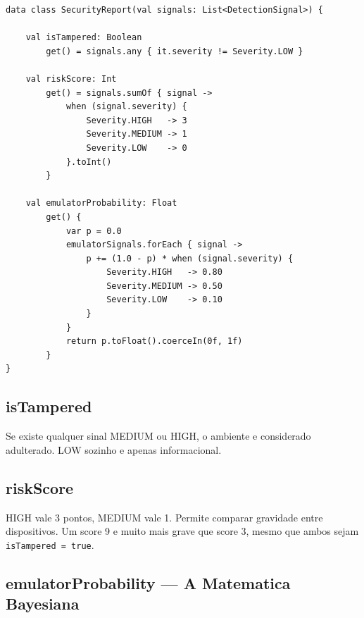 \documentclass[12pt,a4paper]{article}
\begin{document}
\begin{lstlisting}
data class SecurityReport(val signals: List<DetectionSignal>) {

    val isTampered: Boolean
        get() = signals.any { it.severity != Severity.LOW }

    val riskScore: Int
        get() = signals.sumOf { signal ->
            when (signal.severity) {
                Severity.HIGH   -> 3
                Severity.MEDIUM -> 1
                Severity.LOW    -> 0
            }.toInt()
        }

    val emulatorProbability: Float
        get() {
            var p = 0.0
            emulatorSignals.forEach { signal ->
                p += (1.0 - p) * when (signal.severity) {
                    Severity.HIGH   -> 0.80
                    Severity.MEDIUM -> 0.50
                    Severity.LOW    -> 0.10
                }
            }
            return p.toFloat().coerceIn(0f, 1f)
        }
}
\end{lstlisting}

\subsection{isTampered}

Se existe qualquer sinal MEDIUM ou HIGH, o ambiente e considerado adulterado.
LOW sozinho e apenas informacional.

\subsection{riskScore}

HIGH vale 3 pontos, MEDIUM vale 1. Permite comparar gravidade entre dispositivos.
Um score 9 e muito mais grave que score 3, mesmo que ambos sejam \texttt{isTampered = true}.

\subsection{emulatorProbability --- A Matematica Bayesiana}
\end{document}
